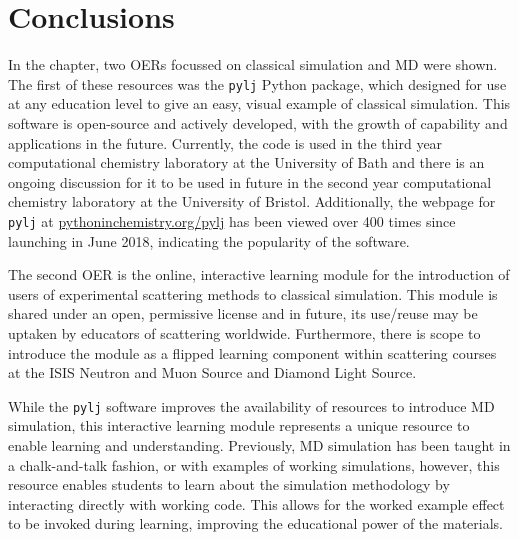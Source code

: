 \section{Conclusions}
In the chapter, two OERs focussed on classical simulation and MD were shown.
The first of these resources was the \texttt{pylj} Python package, which designed for use at any education level to give an easy, visual example of classical simulation.
This software is open-source and actively developed, with the growth of capability and applications in the future.
Currently, the code is used in the third year computational chemistry laboratory at the University of Bath and there is an ongoing discussion for it to be used in future in the second year computational chemistry laboratory at the University of Bristol.
Additionally, the webpage for \texttt{pylj} at \href{https://pythoninchemistry.org/pylj}{pythoninchemistry.org/pylj} has been viewed over 400 times since launching in June 2018, indicating the popularity of the software.

The second OER is the online, interactive learning module for the introduction of users of experimental scattering methods to classical simulation.
This module is shared under an open, permissive license and in future, its use/reuse may be uptaken by educators of scattering worldwide.
Furthermore, there is scope to introduce the module as a flipped learning component within scattering courses at the ISIS Neutron and Muon Source and Diamond Light Source.

While the \texttt{pylj} software improves the availability of resources to introduce MD simulation, this interactive learning module represents a unique resource to enable learning and understanding.
Previously, MD simulation has been taught in a chalk-and-talk fashion, or with examples of working simulations, however, this resource enables students to learn about the simulation methodology by interacting directly with working code.
This allows for the worked example effect to be invoked during learning, improving the educational power of the materials.
